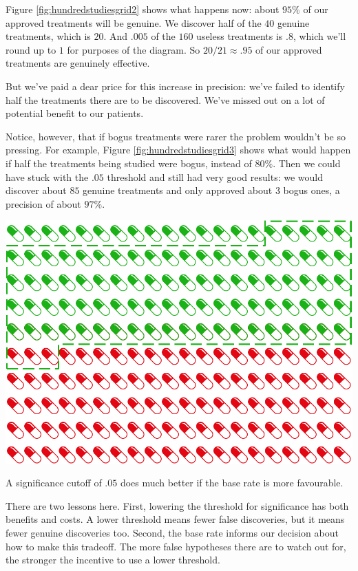 \documentclass[justified]{tufte-book}
\theoremstyle{definition}
\theoremstyle{definition}
\theoremstyle{definition}
\theoremstyle{remark}
\begin{document}
Figure \ref{fig:hundredstudiesgrid2} shows what happens now: about
\(95\%\) of our approved treatments will be genuine. We discover half of
the \(40\) genuine treatments, which is \(20\). And \(.005\) of the
\(160\) useless treatments is \(.8\), which we'll round up to \(1\) for
purposes of the diagram. So \(20/21 \approx .95\) of our approved
treatments are genuinely effective.

But we've paid a dear price for this increase in precision: we've failed
to identify half the treatments there are to be discovered. We've missed
out on a lot of potential benefit to our patients.

Notice, however, that if bogus treatments were rarer the problem
wouldn't be so pressing. For example, Figure
\ref{fig:hundredstudiesgrid3} shows what would happen if half the
treatments being studied were bogus, instead of \(80\%\). Then we could
have stuck with the \(.05\) threshold and still had very good results:
we would discover about \(85\) genuine treatments and only approved
about \(3\) bogus ones, a precision of about \(97\%\).

\begin{marginfigure}
\includegraphics{_main_files/figure-latex/hundredstudiesgrid3-1} \caption[A significance cutoff of $.05$ does much better if the base rate is more favourable]{A significance cutoff of $.05$ does much better if the base rate is more favourable.}\label{fig:hundredstudiesgrid3}
\end{marginfigure}

There are two lessons here. First, lowering the threshold for
significance has both benefits and costs. A lower threshold means fewer
false discoveries, but it means fewer genuine discoveries too. Second,
the base rate informs our decision about how to make this tradeoff. The
more false hypotheses there are to watch out for, the stronger the
incentive to use a lower threshold.
\end{document}
